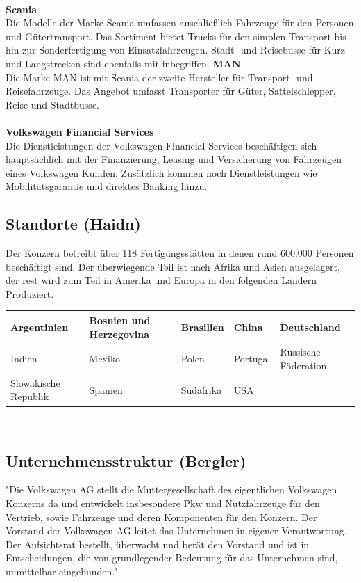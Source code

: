 \documentclass[12pt]{article}
\begin{document}
\\
\textbf{Scania}\\
Die Modelle der Marke Scania umfassen auschließlich Fahrzeuge für den Personen und Gütertransport. Das Sortiment bietet Trucks für den simplen Transport bis hin zur Sonderfertigung von Einsatzfahrzeugen. Stadt- und Reisebusse für Kurz- und Langstrecken sind ebenfalls mit inbegriffen.
\newpage
\textbf{MAN}\\
Die Marke MAN ist mit Scania der zweite Hersteller für Transport- und Reisefahrzeuge. Das Angebot umfasst Transporter für Güter, Sattelschlepper, Reise und Stadtbusse.\\
\\
\textbf{Volkswagen Financial Services}\\
Die Dienstleistungen der Volkswagen Financial Services beschäftigen sich hauptsächlich mit der Finanzierung, Leasing und Versicherung von Fahrzeugen eines Volkswagen Kunden. Zusätzlich kommen noch Dienstleistungen wie Mobilitätsgarantie und direktes Banking hinzu. \cite{vw-produkte}

\subsection{Standorte (Haidn)}
Der Konzern betreibt über 118 Fertigungsstätten in denen rund 600.000 Personen beschäftigt sind.
Der überwiegende Teil ist nach Afrika und Asien ausgelagert, der rest wird zum Teil in Amerika und Europa in den
folgenden Ländern Produziert. \cite{produktionsstandorte}
\begin{table}[h]
	\begin{tabular}{|l|l|l|l|l|}
		\hline
		Argentinien          & Bosnien und Herzegovina & Brasilien & China    & Deutschland          \\ \hline
		Indien               & Mexiko                  & Polen     & Portugal & Russische Föderation \\ \hline
		Slowakische Republik & Spanien                 & Südafrika & USA      &                      \\ \hline
	\end{tabular}
\end{table}
\\


\newpage
\subsection{Unternehmensstruktur (Bergler)}
"Die Volkswagen AG stellt die Muttergesellschaft des eigentlichen Volkswagen Konzerns da und entwickelt insbesondere Pkw und Nutzfahrzeuge für den Vertrieb, sowie Fahrzeuge und deren Komponenten für den Konzern. Der Vorstand der Volkswagen AG leitet das Unternehmen in eigener Verantwortung. Der Aufsichtsrat bestellt, überwacht und berät den Vorstand und ist in Entscheidungen, die von grundlegender Bedeutung für das Unternehmen sind, unmittelbar eingebunden." \cite{struktur}
\end{document}
